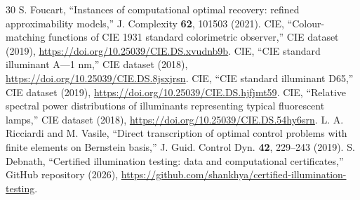 \documentclass{optica-article}
\begin{document}
\begin{thebibliography}{30}
 S. Foucart, ``Instances of computational optimal recovery: refined approximability models,'' J. Complexity \textbf{62}, 101503 (2021).
 CIE, ``Colour-matching functions of CIE 1931 standard colorimetric observer,'' CIE dataset (2019), \url{https://doi.org/10.25039/CIE.DS.xvudnb9b}.
 CIE, ``CIE standard illuminant A---1 nm,'' CIE dataset (2018), \url{https://doi.org/10.25039/CIE.DS.8jsxjrsn}.
 CIE, ``CIE standard illuminant D65,'' CIE dataset (2019), \url{https://doi.org/10.25039/CIE.DS.hjfjmt59}.
 CIE, ``Relative spectral power distributions of illuminants representing typical fluorescent lamps,'' CIE dataset (2018), \url{https://doi.org/10.25039/CIE.DS.54hy6srn}.
 L. A. Ricciardi and M. Vasile, ``Direct transcription of optimal control problems with finite elements on Bernstein basis,'' J. Guid. Control Dyn. \textbf{42}, 229--243 (2019).
 S. Debnath, ``Certified illumination testing: data and computational certificates,'' GitHub repository (2026), \url{https://github.com/shankhya/certified-illumination-testing}.
\end{thebibliography}
\end{document}
